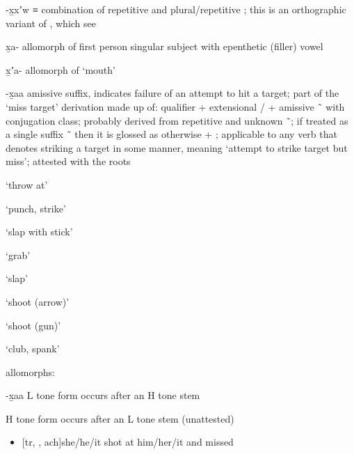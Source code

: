\begin{morphdesc}[resume*=alphalist]
\item[-x̱xʼw]\label{m:-x̱xʼw}
	≡ 
	combination of repetitive 
		and plural/repetitive ;
	this is an orthographic variant of ,
		which see

\item[x̱a-]\label{m:x̱a-}
	allomorph of first person singular subject  with epenthetic (filler) vowel

\item[x̱ʼa-]\label{m:x̱ʼa-}
	allomorph of  ‘mouth’

\item[-x̱aa]\label{m:-x̱aa}
	amissive suffix, indicates failure of an attempt to hit a target;
	part of the ‘miss target’ derivation made up of:
		qualifier 
		+ extensional /
		+ amissive  \~\ 
		with  conjugation class;
	probably derived from repetitive  and unknown  \~\ ;
	if treated as a single suffix  \~\ 
		then it is glossed as 
		otherwise  + ;
	applicable to any verb that denotes striking a target in some manner,
		meaning ‘attempt to strike target but miss’;
	attested with the roots
		\begin{inlinelist}
		\item	{} ‘throw at’
		\item	{} ‘punch, strike’
		\item	{} ‘slap with stick’
		\item	{} ‘grab’
		\item	{} ‘slap’
		\item	{} ‘shoot (arrow)’
		\item	{} ‘shoot (gun)’
		\item	{} ‘club, spank’
		\end{inlinelist}
	\newline
	allomorphs:
	\begin{allolist}
	\item[-x̱aa]	L tone form occurs after an H tone stem
	\item[\X{-x̱áa}]	H tone form occurs after an L tone stem (unattested)
	\end{allolist}
	\begin{itemize}
	\item	{}[tr, , ach]{she/he/it shot at him/her/it and missed}

\end{itemize}
\end{morphdesc}

